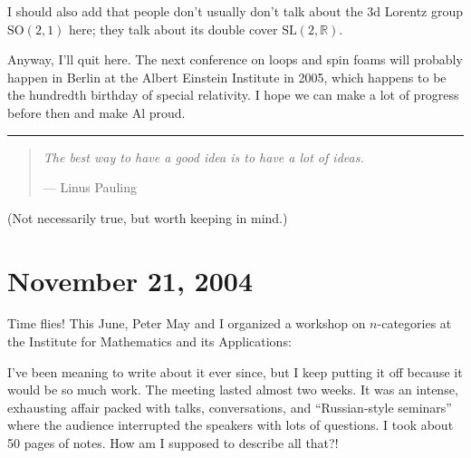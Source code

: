 \documentclass{article}
\def\tightlist{}
\renewcommand{\texttt}[1]{%
  \begingroup
  \ttfamily
  \begingroup\lccode`~=`/\lowercase{\endgroup\def~}{/\discretionary{}{}{}}%
  \begingroup\lccode`~=`[\lowercase{\endgroup\def~}{[\discretionary{}{}{}}%
  \begingroup\lccode`~=`.\lowercase{\endgroup\def~}{.\discretionary{}{}{}}%
  \catcode`/=\active\catcode`[=\active\catcode`.=\active
  \scantokens{#1\noexpand}%
  \endgroup
}
\begin{document}

I should also add that people don't usually don't talk about the 3d
Lorentz group \(\mathrm{SO}(2,1)\) here; they talk about its double
cover \(\mathrm{SL}(2,\mathbb{R})\).

Anyway, I'll quit here. The next conference on loops and spin foams will
probably happen in Berlin at the Albert Einstein Institute in 2005,
which happens to be the hundredth birthday of special relativity. I hope
we can make a lot of progress before then and make Al proud.

\begin{center}\rule{0.5\linewidth}{0.5pt}\end{center}

\begin{quote}
\emph{The best way to have a good idea is to have a lot of ideas.}

--- Linus Pauling
\end{quote}

(Not necessarily true, but worth keeping in mind.)



\hypertarget{week209}{%
\section{November 21, 2004}\label{week209}}

Time flies! This June, Peter May and I organized a workshop on
\(n\)-categories at the Institute for Mathematics and its Applications:


I've been meaning to write about it ever since, but I keep putting it
off because it would be so much work. The meeting lasted almost two
weeks. It was an intense, exhausting affair packed with talks,
conversations, and ``Russian-style seminars'' where the audience
interrupted the speakers with lots of questions. I took about 50 pages
of notes. How am I supposed to describe all that?!
\end{document}
